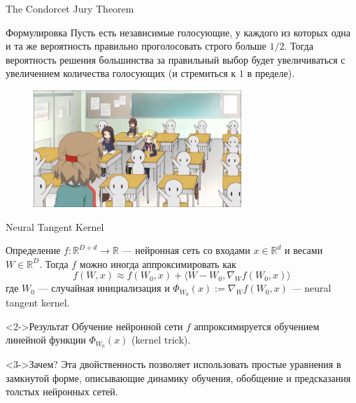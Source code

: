 \documentclass[9pt]{beamer}
\begin{document}
\begin{frame}{The Condorcet Jury Theorem}
    \begin{block}{Формулировка}
        Пусть есть независимые голосующие, у каждого из которых одна и та же вероятность правильно проголосовать строго больше $1/2$. Тогда вероятность решения большинства за правильный выбор будет увеличиваться с увеличением количества голосующих (и стремиться к $1$ в пределе).
    \end{block}

    \begin{figure}
        \centering
        \includegraphics[width=0.7\textwidth]{images/image5.jpg}
    \end{figure}
\end{frame}

\begin{frame}{Neural Tangent Kernel}
    \begin{block}{Определение}
        $f: \mathbb{R}^{D + d} \to \mathbb{R}$ --- нейронная сеть со входами $x \in \mathbb{R}^d$ и весами $W \in \mathbb{R}^D$. Тогда $f$ можно иногда аппроксимировать как \[ f(W, x) \approx f(W_0, x) + \langle W - W_0, \nabla_W f(W_0, x) \rangle \] где $W_0$ --- случайная инициализация и $\Phi_{W_0}(x) := \nabla_W f(W_0, x)$ --- neural tangent kernel.
    \end{block}

    \begin{block}<2->{Результат}
        Обучение нейронной сети $f$ аппроксимируется обучением линейной функции $\Phi_{W_0}(x)$ (kernel trick).
    \end{block}

    \begin{block}<3->{Зачем?}
        Эта двойственность позволяет использовать простые уравнения в замкнутой форме, описывающие динамику обучения, обобщение и предсказания толстых нейронных сетей.
    \end{block}
\end{frame}
\end{document}
